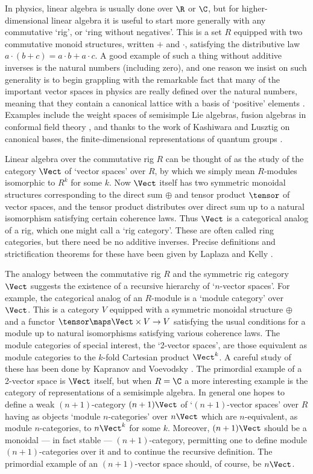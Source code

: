 In physics, linear algebra is usually done over $\R$ or $\C$, but
for higher-dimensional linear algebra it is useful to start
more generally with any commutative `rig', or `ring without
negatives'.   This is a set $R$ equipped with two commutative
monoid structures, written $+$ and $\cdot$,  satisfying the
distributive law $a\cdot (b+c) = a\cdot b + a \cdot c$.  A good
example of such a thing without additive inverses is the natural
numbers (including zero), and one reason we insist on such
generality is to begin grappling with the remarkable fact that
many of the important vector spaces in physics are really
defined over the natural numbers, meaning that they contain a
canonical lattice with a basis of `positive' elements \cite{EK}.
Examples include the weight spaces of semisimple Lie algebras,
fusion algebras in conformal field theory \cite{FK}, and thanks
to the work of Kashiwara and Lusztig on canonical bases, the
finite-dimensional representations of quantum groups \cite{CP,CF}.

Linear algebra over the commutative rig $R$ can be thought of as
the study of the category $\Vect$ of `vector spaces' over $R$, by
which we simply mean $R$-modules isomorphic to $R^k$ for some
$k$.   Now $\Vect$ itself has two symmetric monoidal structures
corresponding to the direct sum $\oplus$ and tensor product
$\tensor$ of vector spaces, and the tensor product distributes
over direct sum up to a natural isomorphism satisfying certain
coherence laws.  Thus $\Vect$ is a categorical analog of a rig,
which one might call a `rig category'.  These are often called
ring categories, but there need be no additive inverses.
Precise definitions and strictification theorems for these have
been given by Laplaza \cite{Laplaza} and Kelly \cite{Kelly2}.

The analogy between the commutative rig $R$ and the symmetric rig
category $\Vect$ suggests the existence of a recursive
hierarchy of `$n$-vector spaces'.  For example, the categorical
analog of an $R$-module is a `module category' over $\Vect$.
This is a category $V$ equipped with a symmetric monoidal structure
$\oplus$ and a functor $\tensor \maps \Vect \times V \to V$
satisfying the usual conditions for a module up to natural
isomorphisms satisfying various coherence laws.
The module categories of special interest, the `2-vector spaces',
are those equivalent as module categories to the
$k$-fold Cartesian product $\Vect^k$.   A careful study of these has
been done by Kapranov and Voevodsky \cite{KV}.   The primordial
example of a 2-vector space is $\Vect$ itself, but when $R = \C$ a
more interesting example is the category of
representations of a semisimple algebra.   In general one hopes
to define a weak $(n+1)$-category  $(n+1)\Vect$ of `$(n+1)$-vector
spaces' over $R$ having as objects `module $n$-categories' over
$n\Vect$ which are $n$-equivalent, as module
$n$-categories, to $n\Vect^k$ for some $k$.   Moreover, $(n+1)\Vect$
should be a monoidal --- in fact stable --- $(n+1)$-category,
permitting one to define module $(n+1)$-categories over it and to
continue the recursive definition.   The primordial example of an
$(n+1)$-vector space should, of course, be $n\Vect$.

